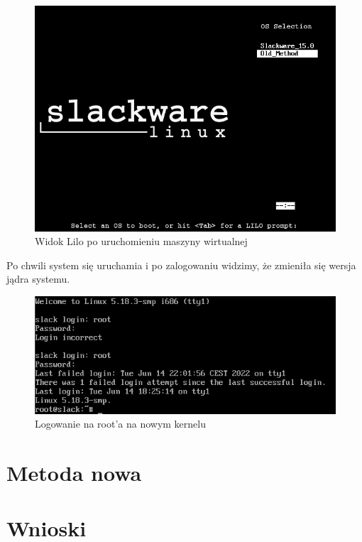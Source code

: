 \documentclass[a4paper,12pt,oneside]{book} %
\begin{document}
\begin{figure}[h]
	\centering
	\includegraphics[scale=0.6]{25-lilo-view}
	\caption{Widok Lilo po uruchomieniu maszyny wirtualnej}
\end{figure}

Po chwili system się uruchamia i po zalogowaniu widzimy, że zmieniła się wersja jądra systemu.

\begin{figure}[h]
	\centering
	\includegraphics[scale=0.6]{26-success}
	\caption{Logowanie na root'a na nowym kernelu}
\end{figure}

\chapter{Metoda nowa}
\label{Metoda nowa}

\chapter{Wnioski}
\label{Wnioski}



\end{document}
